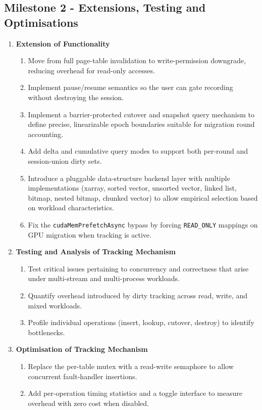 \subsection*{Milestone 2 - Extensions, Testing and Optimisations}
    \begin{enumerate}
        \item \textbf{Extension of Functionality}
        \begin{enumerate}
            \item Move from full page-table invalidation to write-permission downgrade, reducing overhead
                  for read-only accesses.
            \item Implement pause/resume semantics so the user can gate recording without
                  destroying the session.
            \item Implement a barrier-protected cutover and snapshot query mechanism to define precise,
                  linearizable epoch boundaries suitable for migration round accounting.
            \item Add delta and cumulative query modes to support both per-round and session-union dirty sets.
            \item Introduce a pluggable data-structure backend layer with multiple implementations
                  (xarray, sorted vector, unsorted vector, linked list, bitmap, nested bitmap, chunked vector)
                  to allow empirical selection based on workload characteristics.
            \item Fix the \texttt{cudaMemPrefetchAsync} bypass by forcing \texttt{READ\_ONLY} mappings
                  on GPU migration when tracking is active.
        \end{enumerate}
        \item \textbf{Testing and Analysis of Tracking Mechanism}
        \begin{enumerate}
            \item Test critical issues pertaining to concurrency and correctness that arise under
                  multi-stream and multi-process workloads.
            \item Quantify overhead introduced by dirty tracking across read, write, and mixed workloads.
            \item Profile individual operations (insert, lookup, cutover, destroy) to identify bottlenecks.
        \end{enumerate}
        \item \textbf{Optimisation of Tracking Mechanism}
        \begin{enumerate}
            \item Replace the per-table mutex with a read-write semaphore to allow concurrent fault-handler
                  insertions.
            \item Add per-operation timing statistics and a toggle interface to measure overhead with zero
                  cost when disabled.
        \end{enumerate}
    \end{enumerate}

